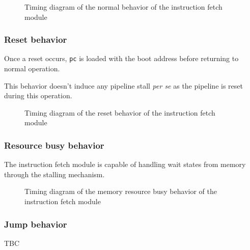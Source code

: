       \begin{figure}[H]
          \centering
          
          \caption{Timing diagram of the normal behavior of the instruction fetch module}
          \label{fig:ifm-behavior-normal}
        \end{figure}

    \subsubsection{Reset behavior}

      \begin{content}
          Once a reset occurs, \texttt{pc} is loaded with the boot address before returning to normal operation.

          This behavior doesn't induce any pipeline stall \textit{per se} as the pipeline is reset during this operation.
        \end{content}

      \begin{figure}[H]
          \centering
          
          \caption{Timing diagram of the reset behavior of the instruction fetch module}
          \label{fig:ifm-behavior-reset}
        \end{figure}

    \subsubsection{Resource busy behavior}

      \begin{content}
          The instruction fetch module is capable of handling wait states from memory through the stalling mechanism.
        \end{content}

      \begin{figure}[H]
          \centering
          
          \caption{Timing diagram of the memory resource busy behavior of the instruction fetch module}
          \label{fig:ifm-behavior-wait}
        \end{figure}

    \subsubsection{Jump behavior}

      \begin{content}
          TBC
        \end{content}

